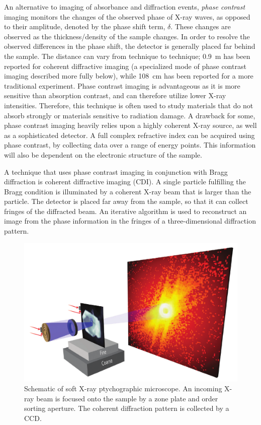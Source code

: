 \documentclass[journal=cmatex,manuscript=perspective]{achemso}
\begin{document}
An alternative to imaging of absorbance and diffraction events,
\emph{phase contrast} imaging monitors the changes of the observed
phase of X-ray waves, as opposed to their amplitude, denoted by the
phase shift term, $\delta$. These changes are observed as the
thickness/density of the sample changes. In order to resolve the
observed differences in the phase shift, the detector is generally
placed far behind the sample. The distance can vary from technique to
technique; \SI{0.9}{m} has been reported for coherent diffractive
imaging (a specialized mode of phase contrast imaging described more
fully below)\cite{shpyrko2014}, while \SI{108}{cm} has been reported
for a more traditional experiment\cite{wen2014}. Phase contrast
imaging is advantageous as it is more sensitive than absorption
contrast, and can therefore utilize lower X-ray intensities. Therefore,
this technique is often used to study materials that do not absorb
strongly or materials sensitive to radiation damage. A drawback for some, phase contrast imaging heavily
relies upon a highly coherent X-ray source, as well as a sophisticated
detector. A full complex refractive index can be acquired using phase
contrast, by collecting data over a range of energy points. This
information will also be dependent on the electronic structure of the
sample.

A technique that uses phase contrast imaging in conjunction with Bragg
diffraction is coherent diffractive imaging (CDI). A single particle
fulfilling the Bragg condition is illuminated by a coherent X-ray beam
that is larger than the particle. The detector is placed far away from
the sample, so that it can collect fringes of the diffracted beam. An
iterative algorithm is used to reconstruct an image from the phase
information in the fringes of a three-dimensional diffraction
pattern\cite{robinson2009}.

\begin{figure}
  \includegraphics[width=\textwidth]{shapiro2014.png}
  \caption{Schematic of soft X-ray ptychographic microscope. An
    incoming X-ray beam is focused onto the sample by a zone plate and
    order sorting aperture. The coherent diffraction pattern is
    collected by a CCD\cite{shapiro2014}.}
  \label{figure:shapiro2014}
\end{figure}
\end{document}
